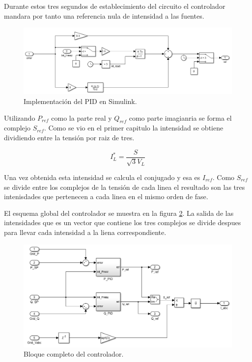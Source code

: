 \documentclass{book}
\begin{document}
Durante estos tres segundos de establecimiento del circuito el controlador mandara por tanto una referencia nula de intensidad a las fuentes. \par  

\begin{figure}[h!]
\centering
\includegraphics[width=1\textwidth]{PID_PQ.PNG}
\caption{Implementaci\'on del PID en Simulink. }
\label{PID_PQ}
\end{figure} \par

Utilizando $P_{ref}$  como la parte real y $Q_{ref}$ como parte imagianria se forma el complejo $S_{ref}$. Como se vio en el primer capitulo la intensidad se obtiene dividiendo entre la tensi\'on por raiz de tres. 

\begin{equation}
	I_L^*= \frac{S}{\sqrt{3}V_L}
\end{equation}

Una vez obtenida esta intensidad se calcula el conjugado y esa es $I_{ref}$. Como $S_{ref}$ se divide entre los complejos de la tensi\'on de cada linea el resultado son las tres intenisdades que pertenecen a cada linea en el mismo orden de fase. \par

El esquema global del controlador se muestra en la figura \ref{PPC}. La salida de las intensidades que es un vector que contiene los tres complejos se divide despues para llevar cada intensidad a la liena correspondiente. \par

\begin{figure}[h!]
\centering
\includegraphics[width=1\textwidth]{PPC.PNG}
\caption{Bloque completo del controlador. }
\label{PPC}
\end{figure} \par
\end{document}
